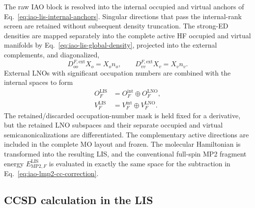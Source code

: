 \documentclass[11pt]{article}
\begin{document}
The raw IAO block is resolved into the internal occupied and virtual anchors
of Eq.~\eqref{eq:iao-lis-internal-anchors}.  Singular directions that pass
the internal-rank screen are retained without subsequent density truncation.
The strong-ED densities are mapped separately into the complete
active HF occupied and virtual manifolds by
Eq.~\eqref{eq:iao-lis-global-density}, projected into the external
complements, and diagonalized,
\begin{equation}
 D_{oo}^{F,\mathrm{ext}}X_o=X_on_o,
 \qquad
 D_{vv}^{F,\mathrm{ext}}X_v=X_vn_v.
 \label{eq:workflow-lno-eigenproblem}
\end{equation}
External LNOs with significant occupation numbers are combined with the
internal spaces to form
\begin{align}
 O_F^{\mathrm{LIS}}
   &=O_F^{\mathrm{int}}\oplus O_F^{\mathrm{LNO}},\\
 V_F^{\mathrm{LIS}}
   &=V_F^{\mathrm{int}}\oplus V_F^{\mathrm{LNO}}.
 \label{eq:workflow-lis-spaces}
\end{align}
The retained/discarded occupation-number mask is held fixed for a derivative,
but the retained LNO subspaces and their separate occupied and virtual
semicanonicalizations are differentiated.  The complementary active
directions are included in the complete MO layout and frozen.  The molecular
Hamiltonian is transformed into the resulting LIS, and the conventional
full-spin MP2 fragment energy $E_{\mathrm{MP2},F}^{\mathrm{LIS}}$ is evaluated
in exactly the same space for the subtraction in
Eq.~\eqref{eq:iao-lmp2-cc-correction}.

\subsection{CCSD calculation in the LIS}
\end{document}
